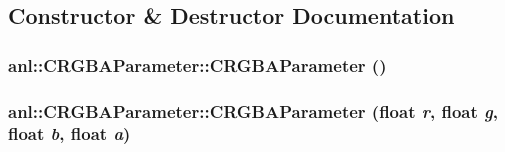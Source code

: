 \subsection{Constructor \& Destructor Documentation}
\hypertarget{classanl_1_1CRGBAParameter_a5b92a7935dcf3998ed3250f536fff651}{
\subsubsection[{CRGBAParameter}]{\setlength{\rightskip}{0pt plus 5cm}anl::CRGBAParameter::CRGBAParameter ()}}
\label{classanl_1_1CRGBAParameter_a5b92a7935dcf3998ed3250f536fff651}
\hypertarget{classanl_1_1CRGBAParameter_aa6df86cd9c0a9844d8004e63344a6f58}{
\subsubsection[{CRGBAParameter}]{\setlength{\rightskip}{0pt plus 5cm}anl::CRGBAParameter::CRGBAParameter (float {\em r}, \/  float {\em g}, \/  float {\em b}, \/  float {\em a})}}
\label{classanl_1_1CRGBAParameter_aa6df86cd9c0a9844d8004e63344a6f58}


